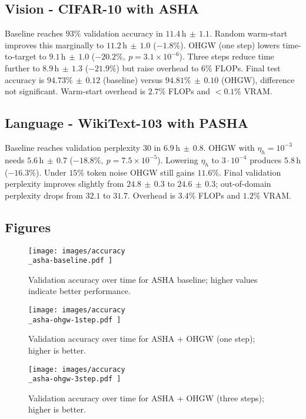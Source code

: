 \documentclass{article}
\begin{document}
\subsection{Vision - CIFAR-10 with ASHA}
Baseline reaches $93\%$ validation accuracy in $11.4\,\mathrm{h} \, \pm \, 1.1$. Random warm-start improves this marginally to $11.2\,\mathrm{h} \, \pm \, 1.0$ ($-1.8\%$). OHGW (one step) lowers time-to-target to $9.1\,\mathrm{h} \, \pm \, 1.0$ ($-20.2\%,\ p = 3.1 \times 10^{-6}$). Three steps reduce time further to $8.9\,\mathrm{h} \, \pm \, 1.3$ ($-21.9\%$) but raise overhead to $6\%$ FLOPs. Final test accuracy is $94.73\% \, \pm \, 0.12$ (baseline) versus $94.81\% \, \pm \, 0.10$ (OHGW), difference not significant. Warm-start overhead is $2.7\%$ FLOPs and $<0.1\%$ VRAM.

\subsection{Language - WikiText-103 with PASHA}
Baseline reaches validation perplexity $30$ in $6.9\,\mathrm{h} \, \pm \, 0.8$. OHGW with $\eta_h = 10^{-3}$ needs $5.6\,\mathrm{h} \, \pm \, 0.7$ ($-18.8\%,\ p = 7.5 \times 10^{-5}$). Lowering $\eta_h$ to $3\cdot 10^{-4}$ produces $5.8\,\mathrm{h}$ ($-16.3\%$). Under $15\%$ token noise OHGW still gains $11.6\%$. Final validation perplexity improves slightly from $24.8 \, \pm \, 0.3$ to $24.6 \, \pm \, 0.3$; out-of-domain perplexity drops from $32.1$ to $31.7$. Overhead is $3.4\%$ FLOPs and $1.2\%$ VRAM.

\subsection{Figures}
\begin{figure}[H]
  \centering
  \texttt{[image:  images/accuracy\\\_asha-baseline.pdf ]}
  \caption{Validation accuracy over time for ASHA baseline; higher values indicate better performance.}
\end{figure}

\begin{figure}[H]
  \centering
  \texttt{[image:  images/accuracy\\\_asha-ohgw-1step.pdf ]}
  \caption{Validation accuracy over time for ASHA + OHGW (one step); higher is better.}
\end{figure}

\begin{figure}[H]
  \centering
  \texttt{[image:  images/accuracy\\\_asha-ohgw-3step.pdf ]}
  \caption{Validation accuracy over time for ASHA + OHGW (three steps); higher is better.}
\end{figure}
\end{document}

